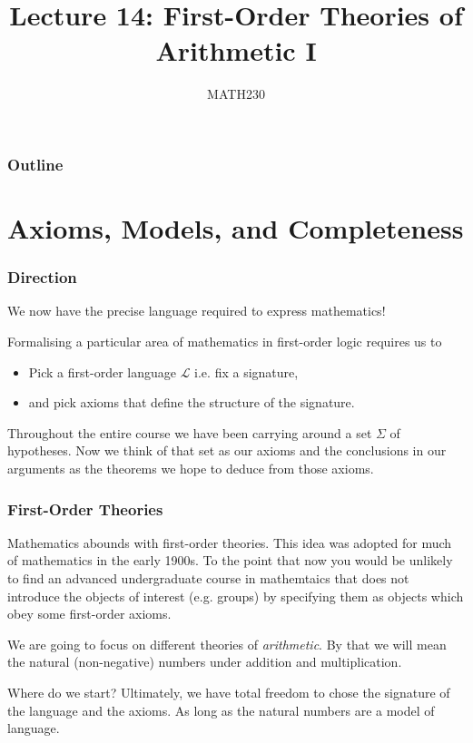 \documentclass{beamer}
\title{Lecture 14: First-Order Theories of Arithmetic I}
\author{MATH230}
\institute{Te Kura P\=angarau $\vert$ School of Mathematics and Statistics \\ Te Whare W\=ananga o Waitaha $\vert$ University of Canterbury}
\date{}
\begin{document}
\begin{frame}

  \titlepage

\end{frame}

\begin{frame}
  \frametitle{Outline}

  \tableofcontents

\end{frame}

\section{Axioms, Models, and Completeness}

\begin{frame}
  \frametitle{Direction}

	We now have the precise language required to express mathematics!
	
	\vspace{0.5cm}
	
	Formalising a particular area of mathematics in first-order logic requires us to
	
	\begin{itemize}
		\item Pick a first-order language $\mathcal{L}$ i.e. fix a signature,
		\item and pick axioms that define the structure of the signature. 
	\end{itemize}
	
	Throughout the entire course we have been carrying around a set $\Sigma$ of hypotheses. Now we think of that set as our axioms and the conclusions in our arguments as the theorems we hope to deduce from those axioms. 
\end{frame}

\begin{frame}
	\frametitle{First-Order Theories}
	
	Mathematics abounds with first-order theories. This idea was adopted for much of mathematics in the early 1900s. To the point that now you would be unlikely to find an advanced undergraduate course in mathemtaics that does not introduce the objects of interest (e.g. groups) by specifying them as objects which obey some first-order axioms. 
	
	\vspace{0.2cm}
	
	We are going to focus on different theories of \textit{arithmetic}. By that we will mean the natural (non-negative) numbers under addition and multiplication.
	
	\vspace{0.2cm}
	
	Where do we start? Ultimately, we have total freedom to chose the signature of the language and the axioms. As long as the natural numbers are a model of language. 

\end{frame}
\end{document}
